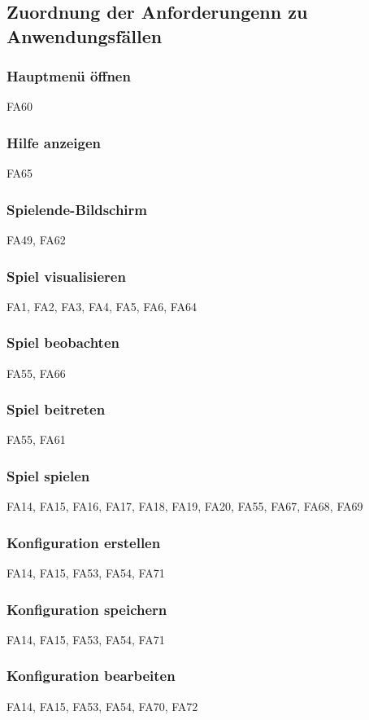 \subsection{Zuordnung der Anforderungenn zu Anwendungsfällen}
\subsubsection{Hauptmenü öffnen}
FA60

\subsubsection{Hilfe anzeigen}
FA65

\subsubsection{Spielende-Bildschirm}
FA49,
FA62

\subsubsection{Spiel visualisieren}
FA1,
FA2, 
FA3, 
FA4, 
FA5, 
FA6, 
FA64

\subsubsection{Spiel beobachten}
FA55,
FA66

\subsubsection{Spiel beitreten}
FA55,
FA61

\subsubsection{Spiel spielen}
FA14, 
FA15, 
FA16, 
FA17, 
FA18, 
FA19, 
FA20, 
FA55, 
FA67,
FA68, 
FA69

\subsubsection{Konfiguration erstellen}
FA14,
FA15, 
FA53, 
FA54, 
FA71

\subsubsection{Konfiguration speichern}
FA14,
FA15, 
FA53, 
FA54, 
FA71

\subsubsection{Konfiguration bearbeiten}
FA14,
FA15, 
FA53, 
FA54, 
FA70, 
FA72


